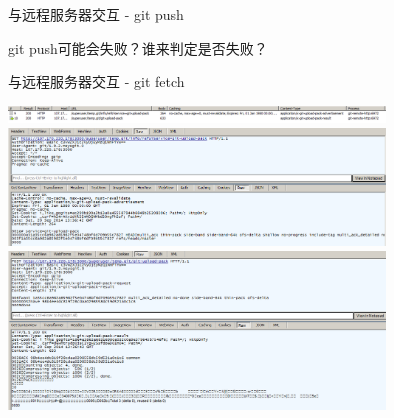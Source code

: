 \documentclass[CJK, 10pt]{beamer}
\begin{document}
\begin{CJK*}{UTF8}{gbsn}
\begin{frame}{与远程服务器交互 - git push}
\begin{center}
        git push可能会失败？谁来判定是否失败？
    \end{center}
\end{frame}
\begin{frame}{与远程服务器交互 - git fetch}
    \begin{center}
        \includegraphics[width=10cm]{git-fetch-remote-1.png} \\
        \includegraphics[width=10cm]{git-fetch-remote-2.png} \\
        \includegraphics[width=10cm]{git-fetch-remote-3.png}
    \end{center}
\end{frame}


\end{CJK*}
\end{document}

